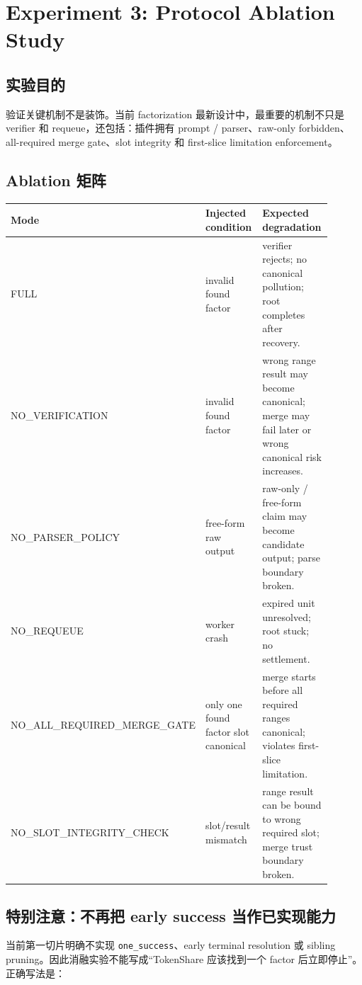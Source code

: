 \documentclass[11pt]{ctexart}
\begin{document}
\section{Experiment 3: Protocol Ablation Study}

\subsection{实验目的}

验证关键机制不是装饰。当前 factorization 最新设计中，最重要的机制不只是 verifier 和 requeue，还包括：插件拥有 prompt / parser、raw-only forbidden、all-required merge gate、slot integrity 和 first-slice limitation enforcement。

\subsection{Ablation 矩阵}

\begin{longtable}{p{0.25\linewidth}p{0.3\linewidth}p{0.35\linewidth}}
\toprule
Mode & Injected condition & Expected degradation \\
\midrule
FULL & invalid found factor & verifier rejects; no canonical pollution; root completes after recovery. \\
NO\_VERIFICATION & invalid found factor & wrong range result may become canonical; merge may fail later or wrong canonical risk increases. \\
NO\_PARSER\_POLICY & free-form raw output & raw-only / free-form claim may become candidate output; parse boundary broken. \\
NO\_REQUEUE & worker crash & expired unit unresolved; root stuck; no settlement. \\
NO\_ALL\_REQUIRED\_MERGE\_GATE & only one found factor slot canonical & merge starts before all required ranges canonical; violates first-slice limitation. \\
NO\_SLOT\_INTEGRITY\_CHECK & slot/result mismatch & range result can be bound to wrong required slot; merge trust boundary broken. \\
\bottomrule
\end{longtable}

\subsection{特别注意：不再把 early success 当作已实现能力}

当前第一切片明确不实现 \texttt{one\_success}、early terminal resolution 或 sibling pruning。因此消融实验不能写成“TokenShare 应该找到一个 factor 后立即停止”。正确写法是：
\end{document}
